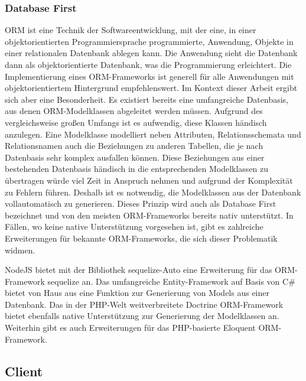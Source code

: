 \subsubsection{Database First}

\ac{ORM} ist eine Technik der Softwareentwicklung, mit der eine, in einer objektorientierten Programmiersprache programmierte, Anwendung, Objekte in einer relationalen Datenbank ablegen kann. Die Anwendung sieht die Datenbank dann als objektorientierte Datenbank, was die Programmierung erleichtert. \parencite[vgl.][511]{Vogel2011} Die Implementierung eines \ac{ORM}-Frameworks ist generell für alle Anwendungen mit objektorientiertem Hintergrund empfehlenswert. Im Kontext dieser Arbeit ergibt sich aber eine Besonderheit. Es existiert bereits eine umfangreiche Datenbasis, aus denen ORM-Modelklassen abgeleitet werden müssen. Aufgrund des vergleichsweise großen Umfangs ist es aufwendig, diese Klassen händisch anzulegen. Eine Modelklasse modelliert neben Attributen, Relationsschemata und Relationsnamen auch die Beziehungen zu anderen Tabellen, die je nach Datenbasis sehr komplex ausfallen können. Diese Beziehungen aus einer bestehenden Datenbasis händisch in die entsprechenden Modelklassen zu übertragen würde viel Zeit in Anspruch nehmen und aufgrund der Komplexität zu Fehlern führen. Deshalb ist es notwendig, die Modelklassen aus der Datenbank vollautomatisch zu generieren. Dieses Prinzip wird auch als Database First bezeichnet und von den meisten ORM-Frameworks bereits nativ unterstützt. In Fällen, wo keine native Unterstützung vorgesehen ist, gibt es zahlreiche Erweiterungen für bekannte ORM-Frameworks, die sich dieser Problematik widmen.

NodeJS bietet mit der Bibliothek sequelize-Auto eine Erweiterung für das ORM-Framework sequelize an. Das umfangreiche Entity-Framework auf Basis von C\# bietet von Haus aus eine Funktion zur Generierung von Models aus einer Datenbank. Das in der PHP-Welt weitverbreitete Doctrine ORM-Framework bietet ebenfalls native Unterstützung zur Generierung der Modelklassen an. Weiterhin gibt es auch Erweiterungen für das PHP-basierte Eloquent ORM-Framework.

\subsection{Client}
\label{sec:Analyse:Client}


